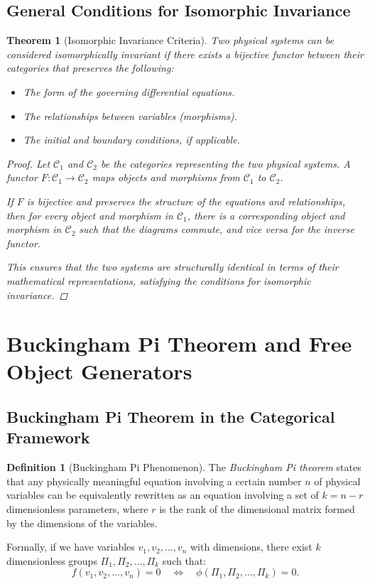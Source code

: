 \documentclass{article}
\newtheorem{theorem}{Theorem}[section]
\theoremstyle{definition}
\newtheorem{definition}{Definition}[section]
\theoremstyle{remark}
\begin{document}
	\subsection{General Conditions for Isomorphic Invariance}
	
	\begin{theorem}[Isomorphic Invariance Criteria]
		Two physical systems can be considered isomorphically invariant if there exists a bijective functor between their categories that preserves the following:
		
		\begin{itemize}
			\item The form of the governing differential equations.
			\item The relationships between variables (morphisms).
			\item The initial and boundary conditions, if applicable.
		\end{itemize}
		
		\begin{proof}
			Let $\mathcal{C}_1$ and $\mathcal{C}_2$ be the categories representing the two physical systems. A functor $F: \mathcal{C}_1 \rightarrow \mathcal{C}_2$ maps objects and morphisms from $\mathcal{C}_1$ to $\mathcal{C}_2$.
			
			If $F$ is bijective and preserves the structure of the equations and relationships, then for every object and morphism in $\mathcal{C}_1$, there is a corresponding object and morphism in $\mathcal{C}_2$ such that the diagrams commute, and vice versa for the inverse functor.
			
			This ensures that the two systems are structurally identical in terms of their mathematical representations, satisfying the conditions for isomorphic invariance.
			
		\end{proof}
	\end{theorem}
	
		\section{Buckingham Pi Theorem and Free Object Generators}
	
	\subsection{Buckingham Pi Theorem in the Categorical Framework}
	
	\begin{definition}[Buckingham Pi Phenomenon]
		The \emph{Buckingham Pi theorem} states that any physically meaningful equation involving a certain number $n$ of physical variables can be equivalently rewritten as an equation involving a set of $k = n - r$ dimensionless parameters, where $r$ is the rank of the dimensional matrix formed by the dimensions of the variables.
		
		Formally, if we have variables $v_1, v_2, \dots, v_n$ with dimensions, there exist $k$ dimensionless groups $\Pi_1, \Pi_2, \dots, \Pi_k$ such that:
		\[
		f(v_1, v_2, \dots, v_n) = 0 \quad \iff \quad \phi(\Pi_1, \Pi_2, \dots, \Pi_k) = 0.
		\]
	\end{definition}
	
\end{document}
